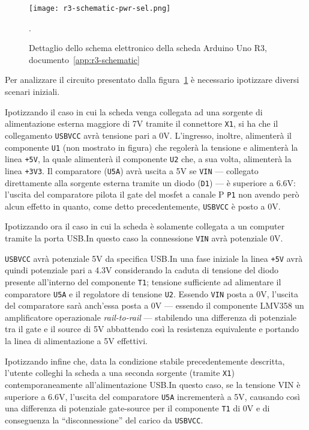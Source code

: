 \begin{figure}[t]
    \centering
    \texttt{[image: r3-schematic-pwr-sel.png]}
    \caption[Dettaglio dello schema elettronico posto in appendice, documento~\ref{app:r3-schematic}]{Dettaglio dello schema elettronico della scheda Arduino Uno R3, documento~\ref{app:r3-schematic}~\cite{site:r3-schematic}}\label{fig:r3-schematic-pwr-sel-detail}.
\end{figure}

Per analizzare il circuito presentato dalla figura~\ref{fig:r3-schematic-pwr-sel-detail} è necessario ipotizzare diversi scenari iniziali.

Ipotizzando il caso in cui la scheda venga collegata ad una sorgente di alimentazione esterna maggiore di 7V tramite il connettore \texttt{X1}, si ha che il collegamento \texttt{USBVCC} avrà tensione pari a 0V.
L'ingresso, inoltre, alimenterà il componente \texttt{U1} (non mostrato in figura) che regolerà la tensione e alimenterà la linea \texttt{+5V}, la quale alimenterà il componente \texttt{U2} che, a sua volta, alimenterà la linea \texttt{+3V3}.
Il comparatore (\texttt{U5A}) avrà uscita a 5V se \texttt{VIN} --- collegato direttamente alla sorgente esterna tramite un diodo (\texttt{D1}) --- è superiore a 6.6V: l'uscita del comparatore pilota il gate del mosfet a canale P \texttt{P1} non avendo però alcun effetto in quanto, come detto precedentemente, \texttt{USBVCC} è posto a 0V.

Ipotizzando ora il caso in cui la scheda è solamente collegata a un computer tramite la porta USB.\@ In questo caso la connessione \texttt{VIN} avrà potenziale 0V.

\texttt{USBVCC} avrà potenziale 5V da specifica USB.\@ In una fase iniziale la linea \texttt{+5V} avrà quindi potenziale pari a 4.3V considerando la caduta di tensione del diodo presente all'interno del componente \texttt{T1}; tensione sufficiente ad alimentare il comparatore \texttt{U5A} e il regolatore di tensione \texttt{U2}.
Essendo \texttt{VIN} posta a 0V, l'uscita del comparatore sarà anch'essa posta a 0V --- essendo il componente LMV358 un amplificatore operazionale \textit{rail-to-rail}\cite{ti:lmv358} ---
stabilendo una differenza di potenziale tra il gate e il source di 5V abbattendo così la resistenza equivalente e portando la linea di alimentazione a 5V effettivi\cite{onsemi:fdn340p}.

Ipotizzando infine che, data la condizione stabile precedentemente descritta, l'utente colleghi la scheda a una seconda sorgente (tramite \texttt{X1}) contemporaneamente all'alimentazione USB.\@ In questo caso, se la tensione VIN è superiore a 6.6V, l'uscita del comparatore \texttt{U5A} incrementerà a 5V, causando così una differenza di potenziale gate-source per il componente \texttt{T1} di 0V e di conseguenza la ``disconnessione'' del carico da \texttt{USBVCC}.

